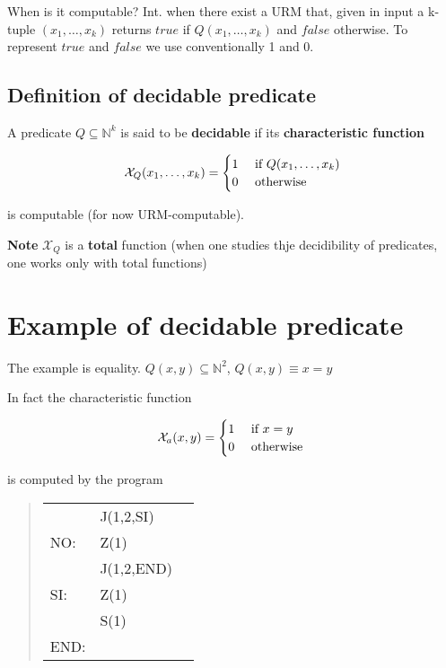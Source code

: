 \documentclass{amsbook}
\newcommand{\nat}{\ensuremath{\mathbb{N}}}
\theoremstyle{definition}
\theoremstyle{remark}
\numberwithin{section}{chapter}
\numberwithin{equation}{chapter}
\begin{document}
When is it computable? Int. when there exist a URM that, given in input a k-tuple $(x_1,\dots,x_k)$ returns $true$ if $Q(x_1,\dots,x_k)$ and $false$ otherwise. To represent $true$ and $false$ we use conventionally 1 and 0.

\subsection{Definition of decidable predicate}

A predicate $Q \subseteq \nat^k$ is said to be \textbf{decidable} if its \textbf{characteristic function}

\begin{equation*}
	\mathcal{X}_Q(x_1,\dots,x_k) = \begin{cases}
		1 & $ if $ Q(x_1,\dots,x_k) \\
		0 & $ otherwise $
	\end{cases}
\end{equation*}

is computable (for now URM-computable).

\textbf{Note} $\mathcal{X}_Q$ is a \textbf{total} function (when one studies thje decidibility of predicates, one works only with total functions)

\section {Example of decidable predicate}

The example is equality. $ Q(x,y) \subseteq \nat^2 $, $ Q(x,y) \equiv x = y $

In fact the characteristic function

\begin{equation*}
	\mathcal{X}_a(x,y) = \begin{cases}
		1 & $ if $ x = y  \\
		0 & $ otherwise $
	\end{cases}
\end{equation*}

is computed by the program

\begin{quote}
  \begin{tabular}{lll}            
         & J(1,2,SI)  \\
    NO:  & Z(1)       \\
         & J(1,2,END) \\
    SI:  & Z(1)       \\
         & S(1)       \\
    END: &
  \end{tabular}
  \end{quote}
\end{document}
